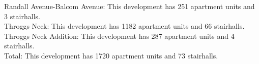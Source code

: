 {Randall Avenue-Balcom Avenue}: This development has 251 apartment units and 3 stairhalls.\\{Throggs Neck}: This development has 1182 apartment units and 66 stairhalls.\\{Throggs Neck Addition}: This development has 287 apartment units and 4 stairhalls.\\{Total}: This development has 1720 apartment units and 73 stairhalls.\\